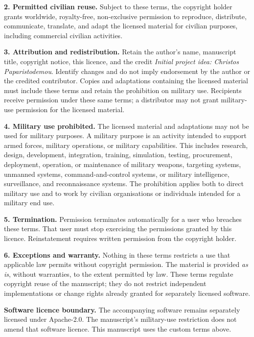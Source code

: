 \documentclass[11pt,a4paper]{article}
\begin{document}
\textbf{2. Permitted civilian reuse.}
Subject to these terms, the copyright holder grants worldwide, royalty-free,
non-exclusive permission to reproduce, distribute, communicate, translate, and
adapt the licensed material for civilian purposes, including commercial civilian
activities.

\textbf{3. Attribution and redistribution.}
Retain the author's name, manuscript title, copyright notice, this licence, and
the credit \emph{Initial project idea: Christos Paparistodemou}. Identify changes
and do not imply endorsement by the author or the credited contributor.
Copies and adaptations containing the licensed material must include these
terms and retain the prohibition on military use. Recipients receive permission
under these same terms; a distributor may not grant military-use permission
for the licensed material.

\textbf{4. Military use prohibited.}
The licensed material and adaptations may not be used for military purposes.
A military purpose is an activity intended to support armed forces, military
operations, or military capabilities. This includes research, design,
development, integration, training, simulation, testing, procurement, deployment,
operation, or maintenance of military weapons, targeting systems, unmanned
systems, command-and-control systems, or military intelligence, surveillance,
and reconnaissance systems. The prohibition applies both to direct military
use and to work by civilian organisations or individuals intended for a military
end use.

\textbf{5. Termination.}
Permission terminates automatically for a user who breaches these terms.
That user must stop exercising the permissions granted by this licence.
Reinstatement requires written permission from the copyright holder.

\textbf{6. Exceptions and warranty.}
Nothing in these terms restricts a use that applicable law permits without
copyright permission. The material is provided \emph{as is}, without warranties,
to the extent permitted by law. These terms regulate copyright reuse of the
manuscript; they do not restrict independent implementations or change rights
already granted for separately licensed software.

\textbf{Software licence boundary.}
The accompanying software remains separately licensed under Apache-2.0.
The manuscript's military-use restriction does not amend that software licence.
This manuscript uses the custom terms above.
\end{document}
